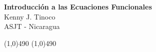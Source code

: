 \begin{center}
{
    \textbf{\Large Introducción a las Ecuaciones Funcionales} \vspace{5mm} \\
    {\large Kenny J. Tinoco} \vspace{3mm} \\
    ASJT - Nicaragua
}
\end{center}

\line(1,0){490}
\tableofcontents
\line(1,0){490}